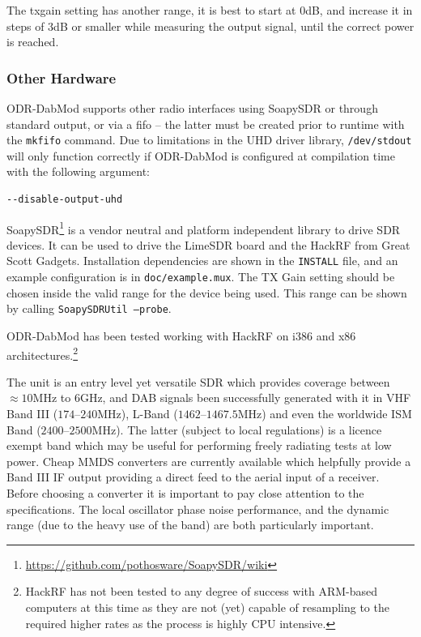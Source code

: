 The txgain setting has another range, it is best to start at $0$dB, and increase
it in steps of $3$dB or smaller while measuring the output signal, until the
correct power is reached.

\subsubsection{Other Hardware}
ODR-DabMod supports other radio interfaces using SoapySDR or through standard output, or via
a fifo -- the latter must be created prior to runtime with the \texttt{mkfifo} command.
Due to limitations in the UHD driver library, \texttt{/dev/stdout} will only
function correctly if ODR-DabMod is configured at compilation time with the
following argument:

\begin{lstlisting}
--disable-output-uhd
\end{lstlisting}

SoapySDR\footnote{\url{https://github.com/pothosware/SoapySDR/wiki}} is a vendor
neutral and platform independent library to drive SDR devices. It can be used to
drive the LimeSDR board and the HackRF from Great Scott Gadgets. Installation
dependencies are shown in the \texttt{INSTALL} file, and an example
configuration is in \texttt{doc/example.mux}. The TX Gain setting should be
chosen inside the valid range for the device being used. This range can be shown
by calling \texttt{SoapySDRUtil --probe}.

ODR-DabMod has been tested working with HackRF on i386 and
x86 architectures.\footnote{HackRF has not been tested to any degree of success
with ARM-based computers at this time as they are not (yet) capable of resampling
to the required higher rates as the process is highly CPU intensive.}

The unit is an entry level yet versatile SDR which provides coverage between
$\approx10$MHz to $6$GHz, and DAB signals been successfully generated with it in
VHF Band III ($174$--$240$MHz), L-Band ($1462$--$1467.5$MHz) and even the worldwide ISM
Band ($2400$--$2500$MHz). The latter (subject to local regulations) is a licence exempt
band which may be useful for performing freely radiating tests at low power. Cheap
MMDS converters are currently available which helpfully provide a Band III IF output
providing a direct feed to the aerial input of a receiver. Before choosing a converter
it is important to pay close attention to the specifications. The local oscillator
phase noise performance, and the dynamic range (due to the heavy use of the band) are
both particularly important.

